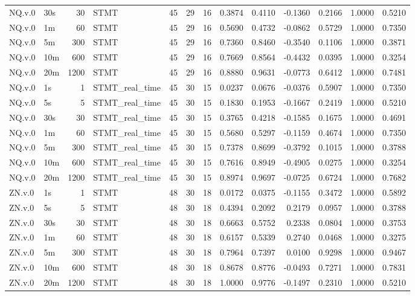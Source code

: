 \begin{tabular}{llrlrrrrrrrrr}
NQ.v.0 & 30s & 30 & STMT & 45 & 29 & 16 & 0.3874 & 0.4110 & -0.1360 & 0.2166 & 1.0000 & 0.5210 \\
NQ.v.0 & 1m & 60 & STMT & 45 & 29 & 16 & 0.5690 & 0.4732 & -0.0862 & 0.5729 & 1.0000 & 0.7350 \\
NQ.v.0 & 5m & 300 & STMT & 45 & 29 & 16 & 0.7360 & 0.8460 & -0.3540 & 0.1106 & 1.0000 & 0.3871 \\
NQ.v.0 & 10m & 600 & STMT & 45 & 29 & 16 & 0.7669 & 0.8564 & -0.4432 & 0.0395 & 1.0000 & 0.3254 \\
NQ.v.0 & 20m & 1200 & STMT & 45 & 29 & 16 & 0.8880 & 0.9631 & -0.0773 & 0.6412 & 1.0000 & 0.7481 \\
NQ.v.0 & 1s & 1 & STMT_real_time & 45 & 30 & 15 & 0.0237 & 0.0676 & -0.0376 & 0.5907 & 1.0000 & 0.7350 \\
NQ.v.0 & 5s & 5 & STMT_real_time & 45 & 30 & 15 & 0.1830 & 0.1953 & -0.1667 & 0.2419 & 1.0000 & 0.5210 \\
NQ.v.0 & 30s & 30 & STMT_real_time & 45 & 30 & 15 & 0.3765 & 0.4218 & -0.1585 & 0.1675 & 1.0000 & 0.4691 \\
NQ.v.0 & 1m & 60 & STMT_real_time & 45 & 30 & 15 & 0.5680 & 0.5297 & -0.1159 & 0.4674 & 1.0000 & 0.7350 \\
NQ.v.0 & 5m & 300 & STMT_real_time & 45 & 30 & 15 & 0.7378 & 0.8699 & -0.3792 & 0.1015 & 1.0000 & 0.3788 \\
NQ.v.0 & 10m & 600 & STMT_real_time & 45 & 30 & 15 & 0.7616 & 0.8949 & -0.4905 & 0.0275 & 1.0000 & 0.3254 \\
NQ.v.0 & 20m & 1200 & STMT_real_time & 45 & 30 & 15 & 0.8974 & 0.9697 & -0.0725 & 0.6724 & 1.0000 & 0.7682 \\
ZN.v.0 & 1s & 1 & STMT & 48 & 30 & 18 & 0.0172 & 0.0375 & -0.1155 & 0.3472 & 1.0000 & 0.5892 \\
ZN.v.0 & 5s & 5 & STMT & 48 & 30 & 18 & 0.4394 & 0.2092 & 0.2179 & 0.0957 & 1.0000 & 0.3788 \\
ZN.v.0 & 30s & 30 & STMT & 48 & 30 & 18 & 0.6663 & 0.5752 & 0.2338 & 0.0804 & 1.0000 & 0.3753 \\
ZN.v.0 & 1m & 60 & STMT & 48 & 30 & 18 & 0.6157 & 0.5339 & 0.2740 & 0.0468 & 1.0000 & 0.3275 \\
ZN.v.0 & 5m & 300 & STMT & 48 & 30 & 18 & 0.7964 & 0.7397 & 0.0100 & 0.9298 & 1.0000 & 0.9467 \\
ZN.v.0 & 10m & 600 & STMT & 48 & 30 & 18 & 0.8678 & 0.8776 & -0.0493 & 0.7271 & 1.0000 & 0.7831 \\
ZN.v.0 & 20m & 1200 & STMT & 48 & 30 & 18 & 1.0000 & 0.9776 & -0.1497 & 0.2310 & 1.0000 & 0.5210 \\

\end{tabular}
